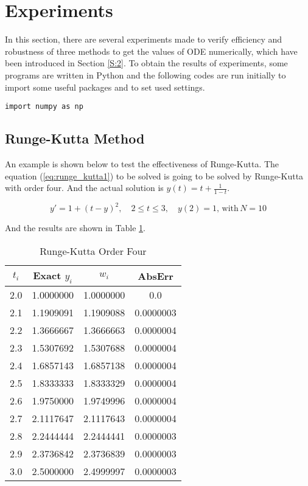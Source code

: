 \documentclass[preprint,12pt]{elsarticle}
\begin{document}
\section{Experiments}
\label{S:3}

In this section, there are several experiments made to verify efficiency and robustness of three methods to get the values of ODE numerically, which have been introduced in Section \ref{S:2}. To obtain the results of experiments, some programs are written in Python and the following codes are run initially to import some useful packages and to set used settings.

\begin{lstlisting}
import numpy as np
\end{lstlisting}

\subsection{Runge-Kutta Method}
\label{SS:3.1}

An example is shown below to test the effectiveness of Runge-Kutta. The equation (\ref{eq:runge_kutta1}) to be solved is going to be solved by Runge-Kutta with order four. And the actual solution is $y(t)=t+\frac{1}{1-t}$.

\begin{equation}
\label{eq:runge_kutta1}
  y' = 1 + (t - y) ^ {2},\quad 2\leq t\leq 3,\quad y(2)=1,\,\mathrm{with}\,N=10
\end{equation}

And the results are shown in Table \ref{tab:runge_kutta}.

\begin{table}[h]
  \centering
  \begin{tabular}{c c c c}
    \hline
    $t_i$ & Exact $y_i$ & $w_i$ & AbsErr \\
    \hline
    2.0 & 1.0000000 & 1.0000000 & 0.0 \\
    2.1 & 1.1909091 & 1.1909088 & 0.0000003 \\
    2.2 & 1.3666667 & 1.3666663 & 0.0000004 \\
    2.3 & 1.5307692 & 1.5307688 & 0.0000004 \\
    2.4 & 1.6857143 & 1.6857138 & 0.0000004 \\
    2.5 & 1.8333333 & 1.8333329 & 0.0000004 \\
    2.6 & 1.9750000 & 1.9749996 & 0.0000004 \\
    2.7 & 2.1117647 & 2.1117643 & 0.0000004 \\
    2.8 & 2.2444444 & 2.2444441 & 0.0000003 \\
    2.9 & 2.3736842 & 2.3736839 & 0.0000003 \\
    3.0 & 2.5000000 & 2.4999997 & 0.0000003
  \end{tabular}
  \caption{Runge-Kutta Order Four}
  \label{tab:runge_kutta}
\end{table}
\end{document}
